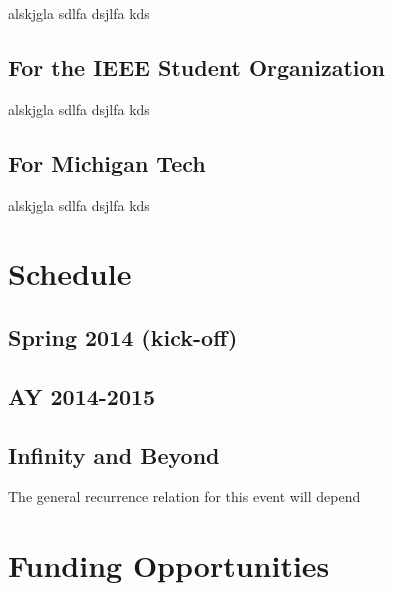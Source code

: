 \documentclass{article}
\begin{document}
alskjgla sdlfa dsjlfa kds


\subsection{For the IEEE Student Organization}

alskjgla sdlfa dsjlfa kds


\subsection{For Michigan Tech}

alskjgla sdlfa dsjlfa kds



\section{Schedule}

\subsection{Spring 2014 (kick-off)}

\subsection{AY 2014-2015}

\subsection{Infinity and Beyond}
The general recurrence relation for this event will depend 


\section{Funding Opportunities}
\end{document}
